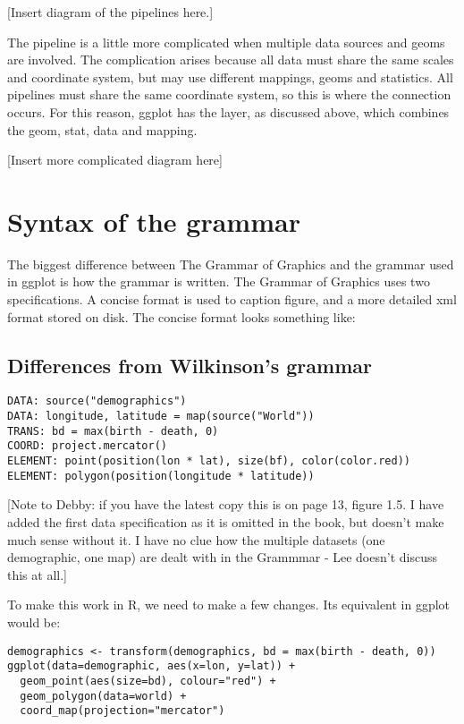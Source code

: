 [Insert diagram of the pipelines here.]

The pipeline is a little more complicated when multiple data sources and geoms are involved.  The complication arises because all data must share the same scales and coordinate system, but may use different mappings, geoms and statistics.  All pipelines must share the same coordinate system, so this is where the connection occurs.  For this reason, ggplot has the layer, as discussed above, which combines the geom, stat, data and mapping.

[Insert more complicated diagram here]

\section{Syntax of the grammar}

The biggest difference between The Grammar of Graphics and the grammar used in ggplot is how the grammar is written.  The Grammar of Graphics uses two specifications.  A concise format is used to caption figure, and a more detailed xml format stored on disk.  The concise format looks something like:

\subsection{Differences from Wilkinson's grammar}


\begin{verbatim}
DATA: source("demographics")
DATA: longitude, latitude = map(source("World"))
TRANS: bd = max(birth - death, 0)
COORD: project.mercator()
ELEMENT: point(position(lon * lat), size(bf), color(color.red))
ELEMENT: polygon(position(longitude * latitude))
\end{verbatim}

[Note to Debby: if you have the latest copy this is on page 13, figure 1.5.  I have added the first data specification as it is omitted in the book, but doesn't make much sense without it.  I have no clue how the multiple datasets (one demographic, one map) are dealt with in the Grammmar - Lee doesn't discuss this at all.]

To make this work in R, we need to make a few changes.  Its equivalent in ggplot would be:

\begin{verbatim}
demographics <- transform(demographics, bd = max(birth - death, 0))
ggplot(data=demographic, aes(x=lon, y=lat)) + 
  geom_point(aes(size=bd), colour="red") +
  geom_polygon(data=world) +
  coord_map(projection="mercator")
\end{verbatim}

